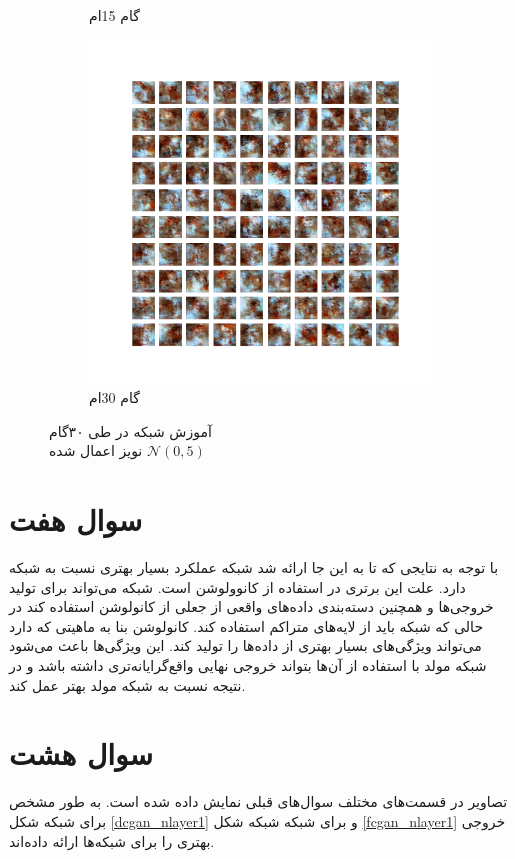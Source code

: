 \documentclass[12pt, a4paper]{book}
\begin{document}
\begin{figure}[h]
\begin{subfigure}{0.3\linewidth}
        \caption{گام 15ام}
    \end{subfigure}
    \begin{subfigure}{0.3\linewidth}
        \includegraphics[width=\linewidth]{images/dcgan/noisy_std5.0/generated_img_30.png}
        \caption{گام 30ام}
    \end{subfigure}
    \caption{آموزش شبکه  در طی ۳۰گام\\ نویز اعمال شده $\mathcal{N}(0,5)$}
    \label{dcgan_noisy_std5.0}
\end{figure}

\section*{سوال هفت}

با توجه به نتایجی که تا به این جا ارائه شد شبکه  عملکرد بسیار بهتری نسبت به شبکه 
دارد. علت این برتری در استفاده از کانوولوشن است. شبکه  می‌تواند برای تولید خروجی‌ها و همچنین
دسته‌بندی داده‌های واقعی از جعلی از کانولوشن استفاده کند در حالی که شبکه  باید از لایه‌های متراکم
استفاده کند. کانولوشن بنا به ماهیتی که دارد می‌تواند ویژگی‌های بسیار بهتری از داده‌ها را تولید کند.
این ویژگی‌ها باعث می‌شود شبکه مولد با استفاده از آن‌ها بتواند خروجی نهایی واقع‌گرایانه‌تری داشته باشد
و در نتیجه نسبت به شبکه مولد  بهتر عمل کند.

\section*{سوال هشت}

تصاویر در قسمت‌های مختلف سوال‌های قبلی نمایش داده شده است. به طور مشخص برای شبکه  شکل
\ref{dcgan_nlayer1} و برای شبکه  شبکه شکل \ref{fcgan_nlayer1} خروجی بهتری را برای شبکه‌ها
ارائه داده‌اند.
\end{document}
